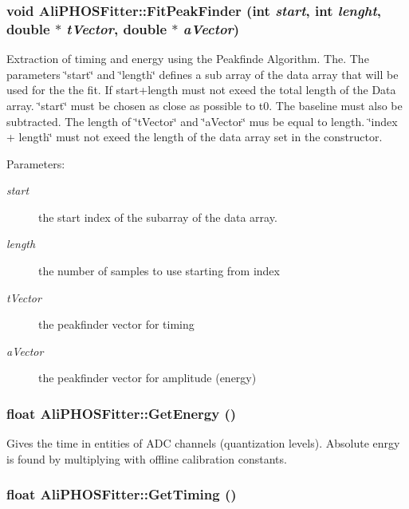 \subsubsection{\setlength{\rightskip}{0pt plus 5cm}void Ali\-PHOSFitter::Fit\-Peak\-Finder (int {\em start}, int {\em lenght}, double $\ast$ {\em t\-Vector}, double $\ast$ {\em a\-Vector})}\label{classAliPHOSFitter_a10}


Extraction of timing and energy using the Peakfinde Algorithm. The. The parameters \char`\"{}start\char`\"{} and \char`\"{}length\char`\"{} defines a sub array of the data array that will be used for the the fit. If start+length must not exeed the total length of the Data array. \char`\"{}start\char`\"{} must be chosen as close as possible to t0. The baseline must also be subtracted. The length of \char`\"{}t\-Vector\char`\"{} and \char`\"{}a\-Vector\char`\"{} mus be equal to length. \char`\"{}index + length\char`\"{} must not exeed the length of the data array set in the constructor. \begin{Desc}
\item[Parameters:]
\begin{description}
\item[{\em start}]the start index of the subarray of the data array. \item[{\em length}]the number of samples to use starting from index \item[{\em t\-Vector}]the peakfinder vector for timing \item[{\em a\-Vector}]the peakfinder vector for amplitude (energy) \end{description}
\end{Desc}
\subsubsection{\setlength{\rightskip}{0pt plus 5cm}float Ali\-PHOSFitter::Get\-Energy ()}\label{classAliPHOSFitter_a13}


Gives the time in entities of ADC channels (quantization levels). Absolute enrgy is found by multiplying with offline calibration constants. 
\subsubsection{\setlength{\rightskip}{0pt plus 5cm}float Ali\-PHOSFitter::Get\-Timing ()}\label{classAliPHOSFitter_a12}


